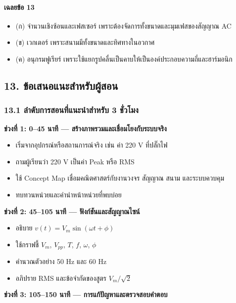 \paragraph{เฉลยข้อ 13}

\begin{itemize}
    \item (ก) จำนวนเชิงซ้อนและเฟสเซอร์ เพราะต้องจัดการทั้งขนาดและมุมเฟสของสัญญาณ AC
    \item (ข) เวกเตอร์ เพราะสนามมีทั้งขนาดและทิศทางในอวกาศ
    \item (ค) อนุกรมฟูเรียร์ เพราะใช้แยกรูปคลื่นเป็นคาบให้เป็นองค์ประกอบความถี่และฮาร์มอนิก
\end{itemize}


 

\subsection{13. ข้อเสนอแนะสำหรับผู้สอน}

\subsubsection{13.1 ลำดับการสอนที่แนะนำสำหรับ 3 ชั่วโมง}

\textbf{ช่วงที่ 1: 0–45 นาที — สร้างภาพรวมและเชื่อมโยงกับระบบจริง}

\begin{itemize}
    \item เริ่มจากอุปกรณ์หรือสถานการณ์จริง เช่น ค่า 220 V ที่ปลั๊กไฟ
    \item ถามผู้เรียนว่า 220 V เป็นค่า Peak หรือ RMS
    \item ใช้ Concept Map เชื่อมคณิตศาสตร์กับงานวงจร สัญญาณ สนาม และระบบควบคุม
    \item ทบทวนหน่วยและคำนำหน้าหน่วยที่พบบ่อย
\end{itemize}

\textbf{ช่วงที่ 2: 45–105 นาที — ฟังก์ชันและสัญญาณไซน์}

\begin{itemize}
    \item อธิบาย $v(t)=V_m\sin(\omega t+\phi)$
    \item ใช้กราฟชี้ $V_m$, $V_{pp}$, $T$, $f$, $\omega$, $\phi$
    \item คำนวณตัวอย่าง 50 Hz และ 60 Hz
    \item อภิปราย RMS และข้อจำกัดของสูตร $V_m/\sqrt{2}$
\end{itemize}

\textbf{ช่วงที่ 3: 105–150 นาที — การแก้ปัญหาและตรวจสอบคำตอบ}

